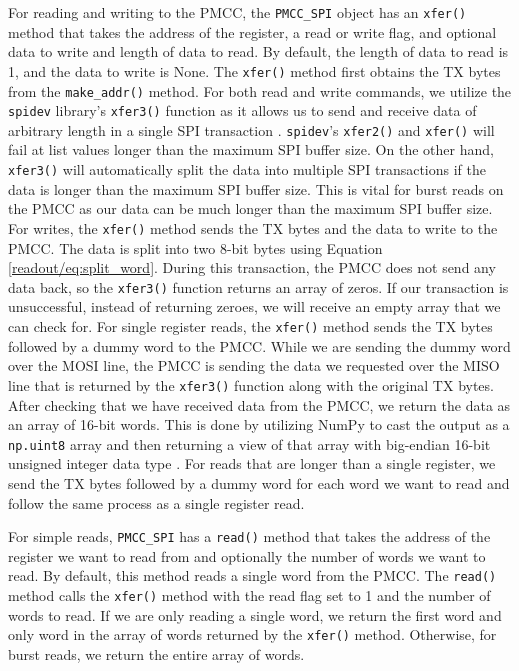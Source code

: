 For reading and writing to the PMCC, the \texttt{PMCC\_SPI} object has an \texttt{xfer()} method that takes the address of the register, a read or write flag, and optional data to write and length of data to read.
By default, the length of data to read is 1, and the data to write is None.
The \texttt{xfer()} method first obtains the TX bytes from the \texttt{make\_addr()} method.
For both read and write commands, we utilize the \texttt{spidev} library's \texttt{xfer3()} function as it allows us to send and receive data of arbitrary length in a single SPI transaction \parencite{spidev}.
\texttt{spidev}'s \texttt{xfer2()} and \texttt{xfer()} will fail at list values longer than the maximum SPI buffer size.
On the other hand, \texttt{xfer3()} will automatically split the data into multiple SPI transactions if the data is longer than the maximum SPI buffer size.
This is vital for burst reads on the PMCC as our data can be much longer than the maximum SPI buffer size.
For writes, the \texttt{xfer()} method sends the TX bytes and the data to write to the PMCC.
The data is split into two 8-bit bytes using Equation \ref{readout/eq:split_word}.
During this transaction, the PMCC does not send any data back, so the \texttt{xfer3()} function returns an array of zeros.
If our transaction is unsuccessful, instead of returning zeroes, we will receive an empty array that we can check for.
For single register reads, the \texttt{xfer()} method sends the TX bytes followed by a dummy word to the PMCC.
While we are sending the dummy word over the MOSI line, the PMCC is sending the data we requested over the MISO line that is returned by the \texttt{xfer3()} function along with the original TX bytes.
After checking that we have received data from the PMCC, we return the data as an array of 16-bit words.
This is done by utilizing NumPy to cast the output as a \texttt{np.uint8} array and then returning a view of that array with big-endian 16-bit unsigned integer data type \parencite{numpy}.
For reads that are longer than a single register, we send the TX bytes followed by a dummy word for each word we want to read and follow the same process as a single register read.

For simple reads, \texttt{PMCC\_SPI} has a \texttt{read()} method that takes the address of the register we want to read from and optionally the number of words we want to read.
By default, this method reads a single word from the PMCC.
The \texttt{read()} method calls the \texttt{xfer()} method with the read flag set to 1 and the number of words to read.
If we are only reading a single word, we return the first word and only word in the array of words returned by the \texttt{xfer()} method. 
Otherwise, for burst reads, we return the entire array of words.

